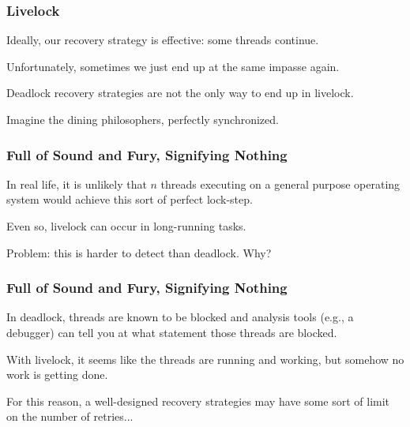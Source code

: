 \begin{frame}
\frametitle{Livelock}

	Ideally, our recovery strategy is effective: some threads continue.
	
	Unfortunately, sometimes we just end up at the same impasse again.
	
	Deadlock recovery strategies are not the only way to end up in livelock.
	
	Imagine the dining philosophers, perfectly synchronized.

\end{frame}


\begin{frame}
\frametitle{Full of Sound and Fury, Signifying Nothing}

	In real life, it is unlikely that $n$ threads executing on a general purpose operating system would achieve this sort of perfect lock-step.
	
	Even so, livelock can occur in long-running tasks.

	Problem: this is harder to detect than deadlock. Why?
\end{frame}


\begin{frame}
\frametitle{Full of Sound and Fury, Signifying Nothing}

	In deadlock, threads are known to be blocked and analysis tools (e.g., a debugger) can tell you at what statement those threads are blocked.
	
	With livelock, it seems like the threads are running and working, but somehow no work is getting done. 

	For this reason, a well-designed recovery strategies may have some sort of limit on the number of retries...

\end{frame}





